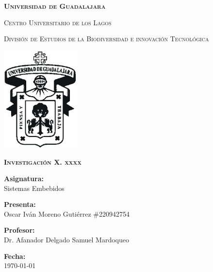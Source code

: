 \documentclass[12pt]{report}
\begin{document}
\setlength{\hoffset}{27 pt} %
\begin{titlepage}
{\centering
{\scshape\bfseries\fontsize{29.16}{34.992}\selectfont Universidad de Guadalajara \par}
\vspace{0.5cm}
{\scshape\Large Centro Universitario de los Lagos \par}
\vspace{1cm}
{\scshape\Large División de Estudios de la Biodiversidad e innovación Tecnológica \par}
\vspace{1cm}
{\graphicspath{{imagenes/Portada}} %
\includegraphics[width=0.3\textwidth]{image.png}\par}
\vspace{1cm}
{\scshape\large\bfseries Investigación X. xxxx \par}
\vspace{1.5cm}
{\large \textbf{Asignatura:} \\Sistemas Embebidos\par}
\vfill
{\large \textbf{Presenta:} \\Oscar Iván Moreno Gutiérrez \#220942754\par}
\vfill
{\large \textbf{Profesor:} \\Dr. Afanador Delgado Samuel Mardoqueo \par}
\vfill
\vfill
\begin{flushright}
  {\normalsize \textbf {Fecha:} \\ \today}
\end{flushright}
\vfill}
{\large  \par}
\end{titlepage}

\tableofcontents
\newpage

\end{document}
